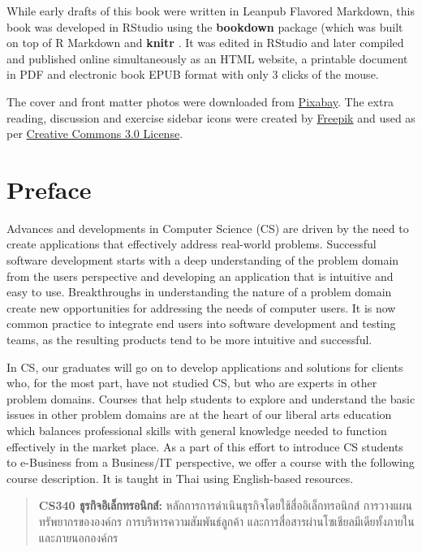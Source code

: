 \documentclass[]{book}
\newcommand{\taibf}{\fontspec[Scale=1.3]{[THSarabunNew Bold.ttf:script=thai]}}
\newcommand{\tai}{\fontspec[Scale=1.3]{[THSarabunNew.ttf:script=thai]}}
\begin{document}
While early drafts of this book were written in Leanpub Flavored Markdown, this book was developed in RStudio using the \textbf{bookdown} package \citep{R-bookdown} (which was built on top of R Markdown and \textbf{knitr} \citep{Xie2015}. It was edited in RStudio and later compiled and published online simultaneously as an HTML website, a printable document in PDF and electronic book EPUB format with only 3 clicks of the mouse.

The cover and front matter photos were downloaded from \href{https://pixabay.com/images/search/singapore}{Pixabay}.
The extra reading, discussion and exercise sidebar icons were created by \href{https://www.freepik.com}{Freepik} and used as per \href{https://creativecommons.org/licenses/by/3.0}{Creative Commons 3.0 License}.

\hypertarget{preface}{%
\chapter*{Preface}\label{preface}}

Advances and developments in Computer Science (CS) are driven by the need to create applications that effectively address real-world problems. Successful software development starts with a deep understanding of the problem domain from the users perspective and developing an application that is intuitive and easy to use. Breakthroughs in understanding the nature of a problem domain create new opportunities for addressing the needs of computer users. It is now common practice to integrate end users into software development and testing teams, as the resulting products tend to be more intuitive and successful.

In CS, our graduates will go on to develop applications and solutions for clients who, for the most part, have not studied CS, but who are experts in other problem domains. Courses that help students to explore and understand the basic issues in other problem domains are at the heart of our liberal arts education which balances professional skills with general knowledge needed to function effectively in the market place.
As a part of this effort to introduce CS students to e-Business from a Business/IT perspective, we offer a course with the following course description. It is taught in Thai using English-based resources.

\begin{quote}
\textbf{CS340 \taibf ธุรกิจอิเล็กทรอนิกส์:} \tai หลักการการดำเนินธุรกิจโดยใช้สื่ออิเล็กทรอนิกส์ การวางแผนทรัพยากรขององค์กร การบริหารความสัมพันธ์ลูกค้า และการสื่อสารผ่านโซเชียลมีเดียทั้งภายในและภายนอกองค์กร
\end{quote}
\end{document}
